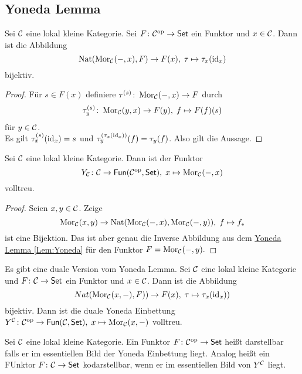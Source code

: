\subsection{Yoneda Lemma}
\begin{Satz}\label{Lem:Yoneda}
    Sei $\mathcal{C}$ eine lokal kleine Kategorie. Sei $F\colon \mathcal{C}^{\mathrm{op}}\to\mathsf{Set}$ ein Funktor und $x\in\mathcal{C}$. Dann ist die Abbildung 
    $$\operatorname{Nat}(\operatorname{Mor}_{\mathcal{C}}(-,x),F)\to F(x),\; \tau\mapsto \tau_x(\mathrm{id}_x)$$ bijektiv.
\end{Satz}
\begin{proof}
    Für $s\in F(x)$ definiere $\tau^{(s)}\colon\operatorname{Mor}_{\mathcal{C}}(-,x)\to F$ durch $$\tau_y^{(s)}\colon \operatorname{Mor}_{\mathcal{C}}(y,x)\to F(y),\; f\mapsto F(f)(s)$$ für $y\in \mathcal{C}$.\\
    Es gilt $\tau_x^{(s)}(\mathrm{id}_x)=s$ und $\tau_y^{(\tau_x(\mathrm{id}_x))}(f)=\tau_y(f)$.
    Also gilt die Aussage.
\end{proof}
\begin{Kor}
    Sei $\mathcal{C}$ eine lokal kleine Kategorie. Dann ist der Funktor $$Y_{\mathcal{C}}\colon\mathcal{C}\to\mathsf{Fun}(\mathcal{C}^{\mathrm{op}},\mathsf{Set}),\; x\mapsto \operatorname{Mor}_{\mathcal{C}}(-,x)$$ volltreu.
\end{Kor}
\begin{proof}
    Seien $x,y\in\mathcal{C}$. Zeige 
    $$\operatorname{Mor}_{\mathcal{C}}(x,y)\to\operatorname{Nat}(\operatorname{Mor}_{\mathcal{C}}(-,x),\operatorname{Mor}_{\mathcal{C}}(-,y)),\; f\mapsto f_*$$ ist eine Bijektion. Das ist aber genau die Inverse Abbildung aus dem \hyperref[Lem:Yoneda]{Yoneda Lemma \ref{Lem:Yoneda}} für den Funktor $F=\operatorname{Mor}_{\mathcal{C}}(-,y).$
\end{proof}
\begin{Bem}
    Es gibt eine duale Version vom Yoneda Lemma. Sei $\mathcal{C}$ eine lokal kleine Kategorie und $F\colon\mathcal{C}\to\mathsf{Set}$ ein Funktor und $x\in\mathcal{C}$. Dann ist die Abbildung 
    $$Nat(\operatorname{Mor}_{\mathcal{C}}(x,-),F))\to F(x),\; \tau\mapsto \tau_x(\mathrm{id}_x))$$ bijektiv. Dann ist die duale Yoneda Einbettung $Y^{\mathcal{C}}\colon\mathcal{C}^{\mathrm{op}}\to\mathsf{Fun}(\mathcal{C},\mathsf{Set}),\; x\mapsto \operatorname{Mor}_{\mathcal{C}}(x,-)$ volltreu.
\end{Bem}
\begin{Def}
    Sei $\mathcal{C}$ eine lokal kleine Kategorie. Ein Funktor $F\colon\mathcal{C}^{\mathrm{op}}\to \mathsf{Set}$ heißt darstellbar falls er im essentiellen Bild der Yoneda Einbettung liegt.  Analog heißt ein FUnktor $F\colon\mathcal{C}\to\mathsf{Set}$  kodarstellbar, wenn er im essentiellen Bild von $Y^{\mathcal{C}}$ liegt.
\end{Def}
